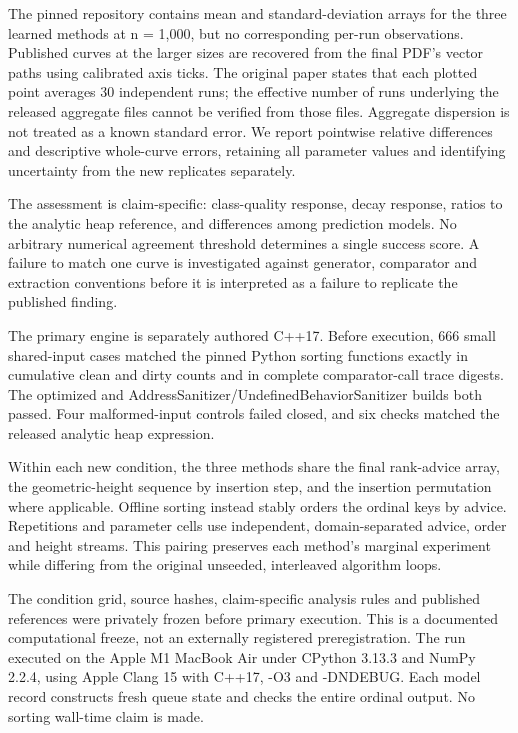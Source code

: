 The pinned repository contains mean and standard-deviation arrays for the three learned methods at n = 1,000, but no corresponding per-run observations. Published curves at the larger sizes are recovered from the final PDF's vector paths using calibrated axis ticks. The original paper states that each plotted point averages 30 independent runs; the effective number of runs underlying the released aggregate files cannot be verified from those files. Aggregate dispersion is not treated as a known standard error. We report pointwise relative differences and descriptive whole-curve errors, retaining all parameter values and identifying uncertainty from the new replicates separately.

The assessment is claim-specific: class-quality response, decay response, ratios to the analytic heap reference, and differences among prediction models. No arbitrary numerical agreement threshold determines a single success score. A failure to match one curve is investigated against generator, comparator and extraction conventions before it is interpreted as a failure to replicate the published finding.

The primary engine is separately authored C++17. Before execution, 666 small shared-input cases matched the pinned Python sorting functions exactly in cumulative clean and dirty counts and in complete comparator-call trace digests. The optimized and AddressSanitizer/UndefinedBehaviorSanitizer builds both passed. Four malformed-input controls failed closed, and six checks matched the released analytic heap expression.

Within each new condition, the three methods share the final rank-advice array, the geometric-height sequence by insertion step, and the insertion permutation where applicable. Offline sorting instead stably orders the ordinal keys by advice. Repetitions and parameter cells use independent, domain-separated advice, order and height streams. This pairing preserves each method's marginal experiment while differing from the original unseeded, interleaved algorithm loops.

The condition grid, source hashes, claim-specific analysis rules and published references were privately frozen before primary execution. This is a documented computational freeze, not an externally registered preregistration. The run executed on the Apple M1 MacBook Air under CPython 3.13.3 and NumPy 2.2.4, using Apple Clang 15 with C++17, -O3 and -DNDEBUG. Each model record constructs fresh queue state and checks the entire ordinal output. No sorting wall-time claim is made.

